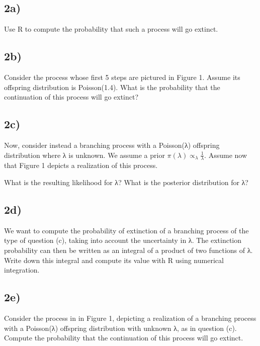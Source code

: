 \documentclass[
  letterpaper,
  DIV=11,
  numbers=noendperiod]{scrartcl}
\begin{document}
\subsection{2a)}\label{a}

Use R to compute the probability that such a process will go extinct.

\subsection{2b)}\label{b}

Consider the process whose first 5 steps are pictured in Figure 1.
Assume its offspring distribution is Poisson(1.4). What is the
probability that the continuation of this process will go extinct?

\subsection{2c)}\label{c-1}

Now, consider instead a branching process with a Poisson(λ) offspring
distribution where λ is unknown. We assume a prior
\(π(λ) ∝_\lambda \frac{1}{\lambda}\). Assume now that Figure 1 depicts a
realization of this process.

What is the resulting likelihood for λ? What is the posterior
distribution for λ?

\subsection{2d)}\label{d-1}

We want to compute the probability of extinction of a branching process
of the type of question (c), taking into account the uncertainty in λ.
The extinction probability can then be written as an integral of a
product of two functions of λ. Write down this integral and compute its
value with R using numerical integration.

\subsection{2e)}\label{e-1}

Consider the process in in Figure 1, depicting a realization of a
branching process with a Poisson(λ) offspring distribution with unknown
λ, as in question (c). Compute the probability that the continuation of
this process will go extinct.
\end{document}
